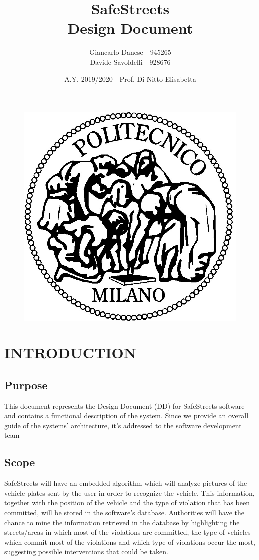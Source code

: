 \documentclass[12pt,a4paper]{article}
\author{Giancarlo Danese - 945265\\
	Davide Savoldelli - 928676}
\date{A.Y. 2019/2020 - Prof. Di Nitto Elisabetta}
\title{
	\textbf{\Huge{SafeStreets}} \\
	\large Design Document
}
\begin{document}
	\begin{figure}
		\centering
		\includegraphics[width=1.0\linewidth]{../assets/images/logo_poli.jpg}
	\end{figure}

	\maketitle
	\newpage
	\tableofcontents
	\newpage

\section{INTRODUCTION}
\subsection{Purpose}
This document represents the Design Document (DD) for SafeStreets software and contains a functional description of the system. Since we provide an overall guide of the systems' architecture, it's addressed to the software development team
\subsection{Scope}
SafeStreets will have an embedded algorithm which will analyze pictures of the vehicle plates sent by the user in order to recognize the vehicle. This information, together with the position of the vehicle and the type of violation that has been committed, will be stored in the software's database.
\newline
Authorities will have the chance to mine the information retrieved in the database by highlighting the streets/areas in which most of the violations are committed, the type of vehicles which commit most of the violations and which type of violations occur the most, suggesting possible interventions that could be taken.	
\end{document}
